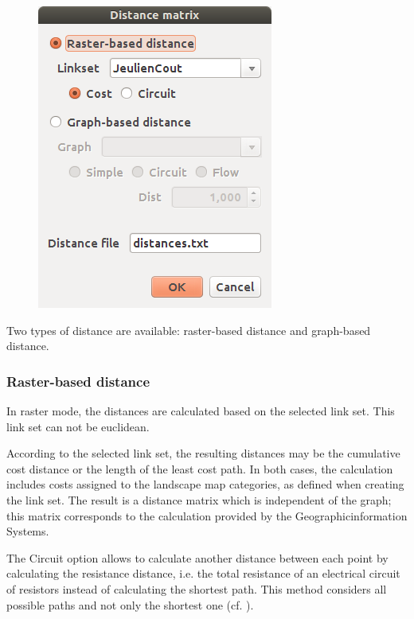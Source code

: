 \documentclass{article}
\begin{document}
\begin{figure}[H]
	\includegraphics[scale=0.5]{img/manual-en_img13b.png} 
\end{figure}

Two types of distance are available: raster-based distance and graph-based distance.

\subsubsection{Raster-based distance}

In raster mode, the distances are calculated based on the selected link set. This link set can not be euclidean.

According to the selected link set, the resulting distances may be the cumulative cost  distance or the length of the least cost path. In both cases, the calculation includes  costs assigned to the landscape map categories, as defined when creating the link set. The result is a distance matrix which is independent of the graph; this matrix corresponds to the calculation provided by the Geographicinformation Systems. 

The Circuit option allows to calculate another distance between each point by calculating the resistance distance, i.e. the total resistance of an electrical circuit of resistors instead of calculating the shortest path. This method considers all possible paths and not only the shortest one (cf. \cite{McRae2008}).
\end{document}
